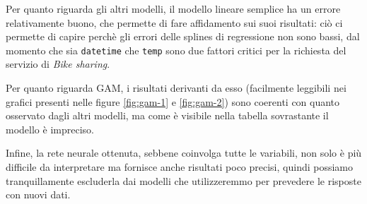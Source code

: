 Per quanto riguarda gli altri modelli, il modello lineare semplice ha un
errore relativamente buono, che permette di fare affidamento sui suoi
risultati: ciò ci permette di capire perchè gli errori delle splines di
regressione non sono bassi, dal momento che sia \texttt{datetime} che
\texttt{temp} sono due fattori critici per la richiesta del servizio di
\emph{Bike sharing}.

Per quanto riguarda GAM, i risultati derivanti da esso (facilmente leggibili
nei grafici presenti nelle figure \ref{fig:gam-1} e \ref{fig:gam-2}) sono
coerenti con quanto osservato dagli altri modelli, ma come è visibile nella
tabella sovrastante il modello è impreciso.

Infine, la rete neurale ottenuta, sebbene coinvolga tutte le variabili, non
solo è più difficile da interpretare ma fornisce anche risultati poco precisi,
quindi possiamo tranquillamente escluderla dai modelli che utilizzeremmo per
prevedere le risposte con nuovi dati.
